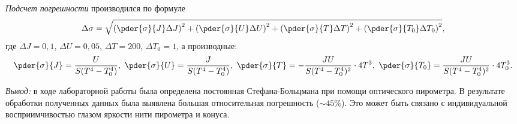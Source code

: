 \documentclass[10pt, pscyr,nonums]{hedlabwork}
\begin{document}
  \emph{Подсчет погрешности} производился по формуле
  \[
    \Delta\sigma = \sqrt{\left( \pder{\sigma}{J}\Delta J \right)^2 +
    \left( \pder{\sigma}{U}\Delta U \right)^2 +
    \left( \pder{\sigma}{T}\Delta T \right)^2 +
    \left( \pder{\sigma}{T_0}\Delta T_0 \right)^2},
  \]
  где \( \Delta J = 0,\!1 \), \( \Delta U = 0,\!05 \), \( \Delta T = 200 \),
  \( \Delta T_0 = 1 \), а производные:
  \[
    \pder{\sigma}{J} = \frac{U}{S(T^4 - T_0^4)}, \ 
    \pder{\sigma}{U} = \frac{J}{S(T^4 - T_0^4)}, \ 
    \pder{\sigma}{T} = -\frac{JU}{S(T^4 - T_0^4)^2}\cdot 4T^3, \ 
    \pder{\sigma}{T_0} = \frac{JU}{S(T^4 - T_0^4)^2}\cdot 4T_0^3.
  \]
  
  \emph{Вывод:} в ходе лабораторной работы была определена постоянная
    Стефана-Больцмана при помощи оптического пирометра. В результате обработки
    полученных данных была выявлена большая относительная погрешность
    (\( \sim 45\% \)). Это может быть связано с индивидуальной восприимчивостью
    глазом яркости нити пирометра и конуса.
\end{document}
